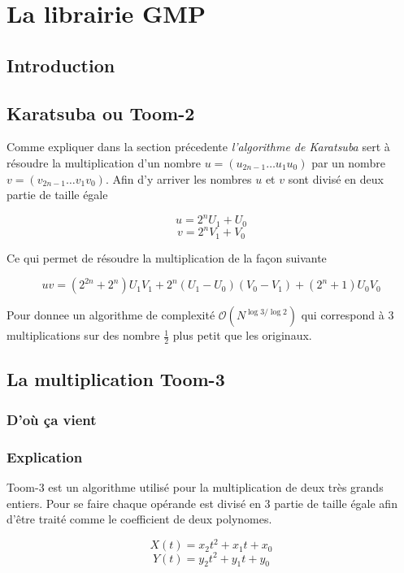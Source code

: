 \documentclass[letterpaper]{article}
\begin{document}
\section{La librairie GMP}
\subsection{Introduction}

\subsection{Karatsuba ou Toom-2}

Comme expliquer dans la section précedente \emph{l'algorithme de Karatsuba} sert
à résoudre la multiplication d'un nombre $u = (u_{2n-1} \dots u_1 u_0)$ par un
nombre $v = (v_{2n-1} \dots v_1 v_0)$. Afin d'y arriver les nombres $u$ et $v$
sont divisé en deux partie de taille égale

  $$u = 2^{n} U_1 + U_0$$
  $$v = 2^{n} V_1 + V_0$$

Ce qui permet de résoudre la multiplication de la façon suivante

  $$uv = (2^{2n} + 2^n) U_1 V_1 + 2^n (U_1 - U_0) (V_0 - V_1) + (2^n + 1) U_0 V_0$$

Pour donnee un algorithme de complexité $\mathcal{O}(N^{\log{3}/\log{2}})$ qui
correspond à $3$ multiplications sur des nombre $\frac{1}{2}$ plus petit que
les originaux\cite{gmplibkaratsuba}.

\subsection{La multiplication Toom-3}

\subsubsection{D'où ça vient}

\subsubsection{Explication}

Toom-3 est un algorithme utilisé pour  la multiplication de deux très grands
entiers. Pour se faire chaque opérande est divisé en 3 partie de taille égale
afin d'être traité comme le coefficient de deux polynomes.\cite{gmplib2014}

    $$X(t) = x_2 t^2 + x_1 t + x_0$$
    $$Y(t) = y_2 t^2 + y_1 t + y_0$$
\end{document}
